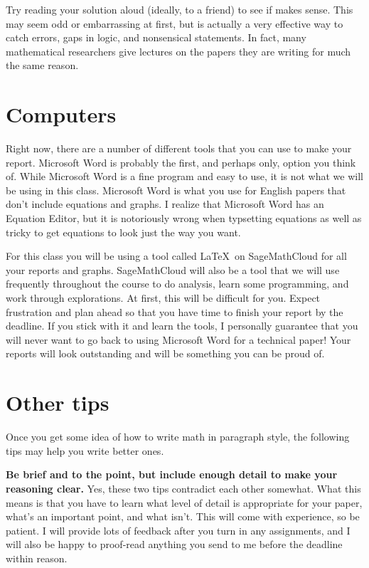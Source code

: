 \documentclass{article}
\begin{document}
Try reading your solution aloud (ideally, to a friend) to see if makes sense. This may seem odd or embarrassing at first, but is actually a very effective way to catch errors, gaps in logic, and nonsensical statements. In fact, many mathematical researchers give lectures on the papers they are writing for much the same reason.

\section*{Computers}

Right now, there are a number of different tools that you can use to make your report. Microsoft Word is probably the first, and perhaps only, option you think of. While Microsoft Word is a fine program and easy to use, it is not what we will be using in this class. Microsoft Word is what you use for English papers that don't include equations and graphs. I realize that Microsoft Word has an Equation Editor, but it is notoriously wrong when typsetting equations as well as tricky to get equations to look just the way you want.

For this class you will be using a tool called \LaTeX\ on SageMathCloud for all your reports and graphs. SageMathCloud will also be a tool that we will use frequently throughout the course to do analysis, learn some programming, and work through explorations. At first, this will be difficult for you. Expect frustration and plan ahead so that you have time to finish your report by the deadline. If you stick with it and learn the tools, I personally guarantee that you will never want to go back to using Microsoft Word for a technical paper! Your reports will look outstanding and will be something you can be proud of.

\section*{Other tips}

Once you get some idea of how to write math in paragraph style, the following tips may help you write better ones.

\textbf{Be brief and to the point, but include enough detail to make your reasoning clear.} Yes, these two tips contradict each other somewhat. What this means is that you have to learn what level of detail is appropriate for your paper, what's an important point, and what isn't. This will come with experience, so be patient. I will provide lots of feedback after you turn in any assignments, and I will also be happy to proof-read anything you send to me before the deadline within reason.
\end{document}
